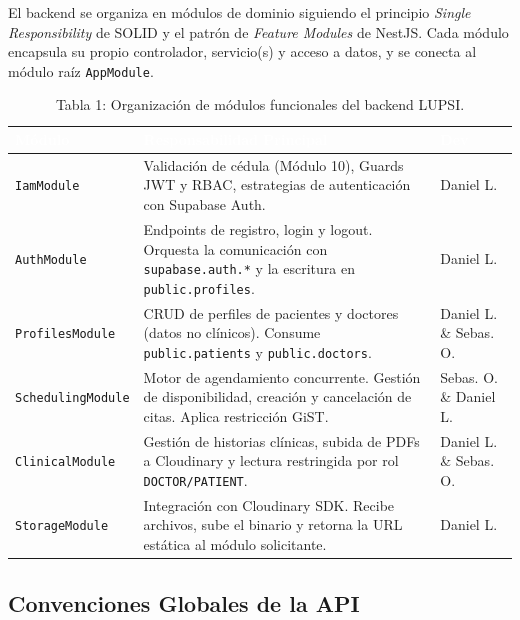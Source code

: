 \documentclass[a4paper,12pt]{article}
\renewcommand{\arraystretch}{1.1}
\begin{document}
El backend se organiza en módulos de dominio siguiendo el principio \textit{Single Responsibility} de SOLID y el patrón de \textit{Feature Modules} de NestJS. Cada módulo encapsula su propio controlador, servicio(s) y acceso a datos, y se conecta al módulo raíz \texttt{AppModule}.

\begin{table}[H]
\centering
\small
\renewcommand{\arraystretch}{1.5}
\begin{tabular}{|p{3.2cm}|p{8.8cm}|p{2.2cm}|}
\hline
\rowcolor{SKTPrimary}
\textcolor{white}{\textbf{Módulo}} &
\textcolor{white}{\textbf{Responsabilidad Principal}} &
\textcolor{white}{\textbf{Dev}} \\
\hline
\texttt{IamModule} & Validación de cédula (Módulo 10), Guards JWT y RBAC, estrategias de autenticación con Supabase Auth. & Daniel L. \\
\hline
\texttt{AuthModule} & Endpoints de registro, login y logout. Orquesta la comunicación con \texttt{supabase.auth.*} y la escritura en \texttt{public.profiles}. & Daniel L. \\
\hline
\texttt{ProfilesModule} & CRUD de perfiles de pacientes y doctores (datos no clínicos). Consume \texttt{public.patients} y \texttt{public.doctors}. & Daniel L. \& Sebas. O. \\
\hline
\texttt{SchedulingModule} & Motor de agendamiento concurrente. Gestión de disponibilidad, creación y cancelación de citas. Aplica restricción GiST. & Sebas. O. \& Daniel L. \\
\hline
\texttt{ClinicalModule} & Gestión de historias clínicas, subida de PDFs a Cloudinary y lectura restringida por rol \texttt{DOCTOR/PATIENT}. & Daniel L. \& Sebas. O. \\
\hline
\texttt{StorageModule} & Integración con Cloudinary SDK. Recibe archivos, sube el binario y retorna la URL estática al módulo solicitante. & Daniel L. \\
\hline
\end{tabular}
\caption*{Tabla 1: Organización de módulos funcionales del backend LUPSI.}
\end{table}

\subsection{Convenciones Globales de la API}
\end{document}

